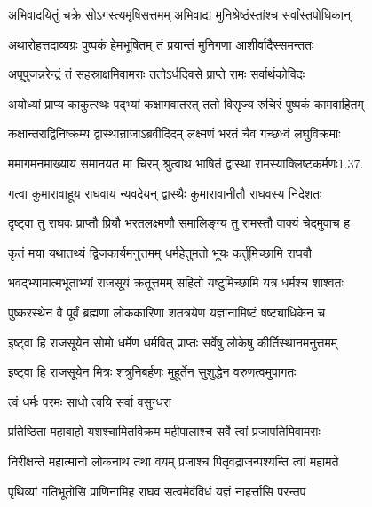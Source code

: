 \twolineshloka
{अभिवादयितुं चक्रे सोऽगस्त्यमृषिसत्तमम्}
{अभिवाद्य मुनिश्रेष्ठंस्तांश्च सर्वांस्तपोधिकान्}%

\twolineshloka
{अथारोहत्तदाव्यग्रः पुष्पकं हेमभूषितम्}
{तं प्रयान्तं मुनिगणा आशीर्वादैस्समन्ततः}%

\twolineshloka
{अपूपुजन्नरेन्द्रं तं सहस्राक्षमिवामराः}
{ततोऽर्धदिवसे प्राप्ते रामः सर्वार्थकोविदः}%

\twolineshloka
{अयोध्यां प्राप्य काकुत्स्थः पद्भ्यां कक्षामवातरत्}
{ततो विसृज्य रुचिरं पुष्पकं कामवाहितम्}%

\twolineshloka
{कक्षान्तराद्विनिष्क्रम्य द्वास्थान्राजाऽब्रवीदिदम्}
{लक्ष्मणं भरतं चैव गच्छध्वं लघुविक्रमाः}%

\twolineshloka
{ममागमनमाख्याय समानयत मा चिरम्}
{श्रुत्वाथ भाषितं द्वास्था रामस्याक्लिष्टकर्मणः1.37.}%

\twolineshloka
{गत्वा कुमारावाहूय राघवाय न्यवदेयन्}
{द्वास्थैः कुमारावानीतौ राघवस्य निदेशतः}%

\twolineshloka
{दृष्ट्वा तु राघवः प्राप्तौ प्रियौ भरतलक्ष्मणौ}
{समालिङ्ग्य तु रामस्तौ वाक्यं चेदमुवाच ह}%

\twolineshloka
{कृतं मया यथातथ्यं द्विजकार्यमनुत्तमम्}
{धर्महेतुमतो भूयः कर्तुमिच्छामि राघवौ}%

\twolineshloka
{भवद्भ्यामात्मभूताभ्यां राजसूयं क्रतूत्तमम्}
{सहितो यष्टुमिच्छामि यत्र धर्मश्च शाश्वतः}%

\twolineshloka
{पुष्करस्थेन वै पूर्वं ब्रह्मणा लोककारिणा}
{शतत्रयेण यज्ञानामिष्टं षष्ट्याधिकेन च}%

\twolineshloka
{इष्ट्वा हि राजसूयेन सोमो धर्मेण धर्मवित्}
{प्राप्तः सर्वेषु लोकेषु कीर्तिस्थानमनुत्तमम्}%

\twolineshloka
{इष्ट्वा हि राजसूयेन मित्रः शत्रुनिबर्हणः}
{मुहूर्तेन सुशुद्धेन वरुणत्वमुपागतः}%



\onelineshloka
{त्वं धर्मः परमः साधो त्वयि सर्वा वसुन्धरा}%

\twolineshloka
{प्रतिष्ठिता महाबाहो यशश्चामितविक्रम}
{महीपालाश्च सर्वे त्वां प्रजापतिमिवामराः}%

\twolineshloka
{निरीक्षन्ते महात्मानो लोकनाथ तथा वयम्}
{प्रजाश्च पितृवद्राजन्पश्यन्ति त्वां महामते}%

\twolineshloka
{पृथिव्यां गतिभूतोसि प्राणिनामिह राघव}
{सत्वमेवंविधं यज्ञं नाहर्त्तासि परन्तप}%


